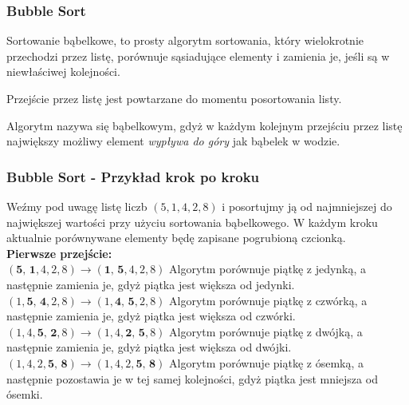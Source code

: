 \documentclass[kslide.tex]{subfiles}
\begin{document}
\begin{frame}
\frametitle{Bubble Sort}
\begin{block}{}
\justifying
Sortowanie bąbelkowe, to prosty algorytm sortowania, który wielokrotnie przechodzi przez listę, porównuje sąsiadujące elementy i zamienia je, jeśli są w niewłaściwej kolejności.\\[0.3cm]\pause

Przejście przez listę jest powtarzane do momentu posortowania listy.\\[0.3cm]\pause

Algorytm nazywa się bąbelkowym, gdyż w każdym kolejnym przejściu przez listę największy możliwy element \textit{wypływa do góry} jak bąbelek w wodzie.
\end{block}
\end{frame}

\begin{frame}
\frametitle{Bubble Sort - Przykład krok po kroku}
Weźmy pod uwagę listę liczb $( 5, 1, 4, 2, 8 )$ i posortujmy ją od najmniejszej do największej wartości przy użyciu sortowania bąbelkowego. W każdym kroku aktualnie porównywane elementy będę zapisane pogrubioną czcionką.\\[0.3cm]\pause
\textbf{Pierwsze przejście:}\\[0.1cm]
        $( \textbf{5, 1}, 4, 2, 8 ) \rightarrow ( \textbf{1, 5}, 4, 2, 8 )$ Algorytm porównuje piątkę z jedynką, a następnie zamienia je, gdyż piątka jest większa od jedynki.\\[0.1cm]
        \pause
        $( 1, \textbf{5, 4}, 2, 8 ) \rightarrow ( 1, \textbf{4, 5}, 2, 8 )$ Algorytm porównuje piątkę z czwórką, a następnie zamienia je, gdyż piątka jest większa od czwórki.\\[0.1cm]
        \pause
        $( 1, 4, \textbf{5, 2}, 8 ) \rightarrow ( 1, 4, \textbf{2, 5}, 8 )$ Algorytm porównuje piątkę z dwójką, a następnie zamienia je, gdyż piątka jest większa od dwójki.\\[0.1cm]
        \pause
        $( 1, 4, 2, \textbf{5, 8} ) \rightarrow ( 1, 4, 2, \textbf{5, 8} )$ Algorytm porównuje piątkę z ósemką, a następnie pozostawia je w tej samej kolejności, gdyż piątka jest mniejsza od ósemki.\\[0.1cm]
\end{frame}
\end{document}
